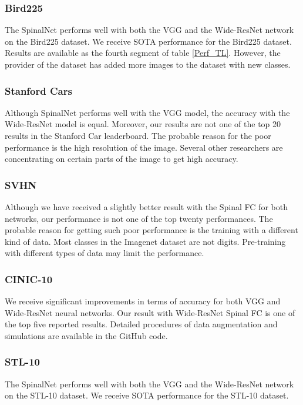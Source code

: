 \documentclass[journal]{IEEEtran}
\begin{document}
\subsubsection{Bird225}
The SpinalNet performs well with both the VGG and the Wide-ResNet network on the Bird225 dataset. We receive SOTA performance for the Bird225 dataset. Results are available as the fourth segment of table \ref{Perf_TL}. However, the provider of the dataset has added more images to the dataset with new classes.

\subsubsection{Stanford Cars}
Although SpinalNet performs well with the VGG model, the accuracy with the Wide-ResNet model is equal. Moreover, our results are not one of the top 20 results in the Stanford Car leaderboard. The probable reason for the poor performance is the high resolution of the image. Several other researchers are concentrating on certain parts of the image to get high accuracy.

\subsubsection{SVHN}
Although we have received a slightly better result with the Spinal FC for both networks, our performance is not one of the top twenty performances. The probable reason for getting such poor performance is the training with a different kind of data. Most classes in the Imagenet dataset are not digits. Pre-training with different types of data may limit the performance.

\subsubsection{CINIC-10}
We receive significant improvements in terms of accuracy for both VGG and Wide-ResNet neural networks. Our result with Wide-ResNet Spinal FC is one of the top five reported results. Detailed procedures of data augmentation and simulations are available in the GitHub code.

\subsubsection{STL-10}
The SpinalNet performs well with both the VGG and the Wide-ResNet network on the STL-10 dataset. We receive SOTA performance for the STL-10 dataset.
\end{document}
